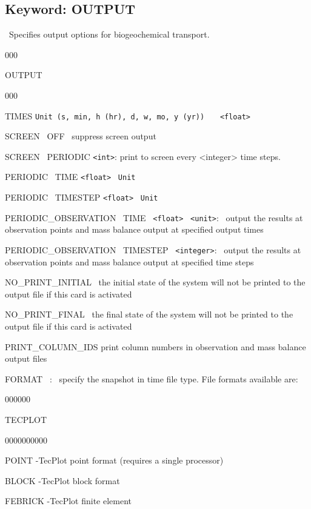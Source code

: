 \hyperlink{target_key}{\return}



\newpage
\protect\hypertarget{target_output}{}

\subsection{Keyword: OUTPUT}

\hfill\hyperlink{target_key}{\return}

 \ Specifies output options for biogeochemical transport.


\begin{deflist}{000}
\item[OUTPUT] 
\begin{deflist}{000}
\item[TIMES] {\tt Unit (s, min, h (hr), d, w, mo, y (yr))} \ \ \ {\tt <float>} 
\item[SCREEN \ OFF] \ suppress screen output
\item[SCREEN \ PERIODIC] {\tt <int>}: print to screen every <integer> time steps.
\item[PERIODIC \ TIME] {\tt <float>} \ {\tt Unit}
\item[PERIODIC \ TIMESTEP] {\tt <float>} \ {\tt Unit}
\item[PERIODIC\_OBSERVATION \ TIME] \ {\tt <float>} \ {\tt <unit>}: \ output the results at observation points and mass balance output at specified output times
\item[PERIODIC\_OBSERVATION \ TIMESTEP] \ {\tt <integer>}: \ output the results at observation points and mass balance output at specified time steps 
\item[NO\_PRINT\_INITIAL] \ the initial state of the system will not be printed to the output file if this card is activated
\item[NO\_PRINT\_FINAL] \ the final state of the system will not be printed to the output file if this card is activated
\item[PRINT\_COLUMN\_IDS] print column numbers in observation and mass balance output files

\item[FORMAT] \ <file format>: \ specify the snapshot in time file type. File formats available are: 

\begin{deflist}{000000}
\item[TECPLOT] ~
\begin{deflist}{0000000000}
\item[POINT] -TecPlot point format (requires a single processor)
\item[BLOCK] -TecPlot block format
\item[FEBRICK] -TecPlot finite element
\end{deflist}


\end{deflist}
\end{deflist}
\end{deflist}
